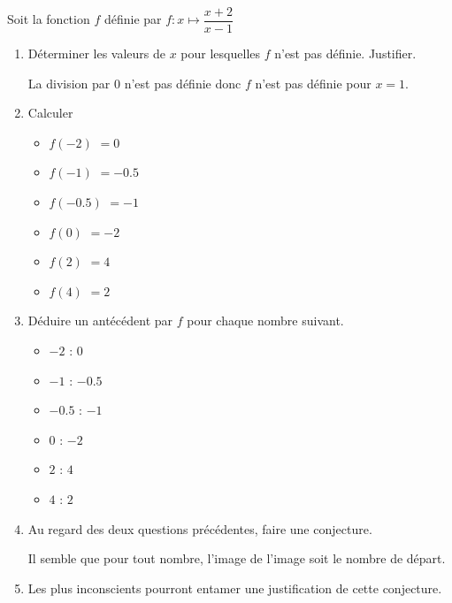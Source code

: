\begin{corrige}
    Soit la fonction $f$ définie par $f:x\longmapsto\dfrac{x+2}{x-1}$

    \begin{enumerate}
        \item Déterminer les valeurs de $x$ pour lesquelles $f$ n'est pas définie. Justifier.
        
        {\red La division par $0$ n'est pas définie donc $f$ n'est pas définie pour $x=1$.}
        \item Calculer
        \begin{multicols}{2}
            \begin{itemize}
                \item $f(-2)$ {\red $=0$ }
                \item $f(-1)$ {\red $=\num{-0.5}$ }
                \item $f(\num{-0.5})$ {\red $=-1$ }
                \item $f(0)$ {\red $=-2$}
                \item $f(2)$ {\red $=4$}
                \item $f(4)$ {\red $=2$}
            \end{itemize}               
        \end{multicols}
        \item Déduire un antécédent par $f$ pour chaque nombre suivant.
        \begin{multicols}{2}
            \begin{itemize}
                \item $-2$ {\red : $0$}
                \item $-1$ {\red : $\num{-0.5}$}
                \item $\num{-0.5}$ {\red : $-1$}
                \item $0$ {\red : $-2$}
                \item $2$ {\red : $4$}
                \item $4$ {\red : $2$}
            \end{itemize}               
        \end{multicols}
        \item Au regard des deux questions précédentes, faire une conjecture.
        
        {\red Il semble que pour tout nombre, l'image de l'image soit le nombre de départ.}
    \end{enumerate}
    \Coupe
    \begin{enumerate}
    \setcounter{enumi}{4}
        \item Les plus inconscients pourront entamer une justification de cette conjecture.
        

\end{enumerate}
\end{corrige}
